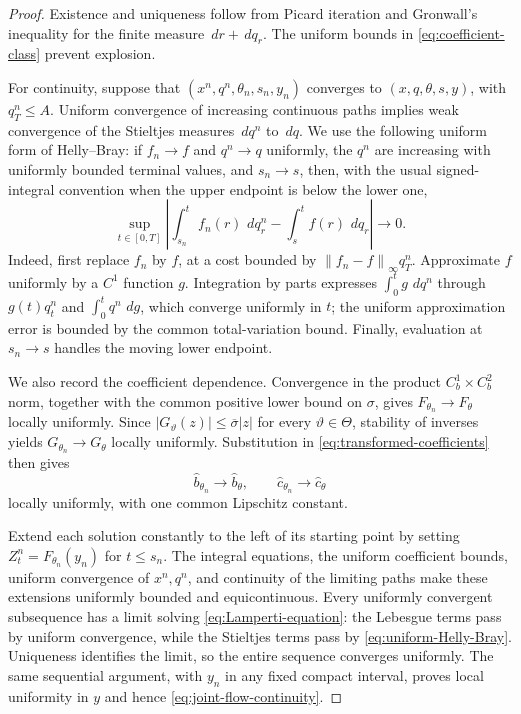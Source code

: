 \documentclass[11pt,reqno]{amsart}
\theoremstyle{plain}
\theoremstyle{definition}
\newcommand{\dd}{\,d}
\newcommand{\norm}[1]{\left\lVert #1\right\rVert}
\newcommand{\abs}[1]{\left\lvert #1\right\rvert}
\begin{document}
\begin{proof}
Existence and uniqueness follow from Picard iteration and Gronwall's
inequality for the finite measure \(\dd r+\dd q_r\).  The uniform bounds in
\eqref{eq:coefficient-class} prevent explosion.

For continuity, suppose that
\((x^n,q^n,\theta_n,s_n,y_n)\) converges to
\((x,q,\theta,s,y)\), with \(q_T^n\le A\).  Uniform convergence of increasing
continuous paths implies weak convergence of the Stieltjes measures
\(\dd q^n\) to \(\dd q\).  We use the following uniform form of
Helly--Bray: if \(f_n\to f\) and \(q^n\to q\) uniformly, the \(q^n\) are
increasing with uniformly bounded terminal values, and \(s_n\to s\), then,
with the usual signed-integral convention when the upper endpoint is below
the lower one,
\begin{equation}\label{eq:uniform-Helly-Bray}
  \sup_{t\in[0,T]}
  \left|
    \int_{s_n}^t f_n(r)\,\dd q_r^n
    -
    \int_s^t f(r)\,\dd q_r
  \right|
  \longrightarrow0.
\end{equation}
Indeed, first replace \(f_n\) by \(f\), at a cost bounded by
\(\norm{f_n-f}_\infty q_T^n\).  Approximate \(f\) uniformly by a \(C^1\)
function \(g\).  Integration by parts expresses
\(\int_0^t g\,\dd q^n\) through \(g(t)q_t^n\) and
\(\int_0^t q^n\,\dd g\), which converge uniformly in \(t\); the uniform
approximation error is bounded by the common total-variation bound.  Finally,
evaluation at \(s_n\to s\) handles the moving lower endpoint.

We also record the coefficient dependence.  Convergence in the product
\(C_b^1\times C_b^2\) norm, together with the common positive lower bound on
\(\sigma\), gives \(F_{\theta_n}\to F_\theta\) locally uniformly.  Since
\(\abs{G_\vartheta(z)}\le\overline\sigma\abs z\) for every
\(\vartheta\in\Theta\), stability of inverses yields
\(G_{\theta_n}\to G_\theta\) locally uniformly.  Substitution in
\eqref{eq:transformed-coefficients} then gives
\[
  \widehat b_{\theta_n}\longrightarrow\widehat b_\theta,
  \qquad
  \widehat c_{\theta_n}\longrightarrow\widehat c_\theta
\]
locally uniformly, with one common Lipschitz constant.

Extend each solution constantly to the left of its starting point by setting
\(Z_t^n=F_{\theta_n}(y_n)\) for \(t\le s_n\).  The integral equations, the
uniform coefficient bounds, uniform convergence of \(x^n,q^n\), and
continuity of the limiting paths make these extensions uniformly bounded and
equicontinuous.  Every uniformly convergent subsequence has a limit solving
\eqref{eq:Lamperti-equation}: the Lebesgue terms pass by uniform convergence,
while the Stieltjes terms pass by \eqref{eq:uniform-Helly-Bray}.  Uniqueness
identifies the limit, so the entire sequence converges uniformly.  The same
sequential argument, with \(y_n\) in any fixed compact interval, proves local
uniformity in \(y\) and hence \eqref{eq:joint-flow-continuity}.


\end{proof}
\end{document}
